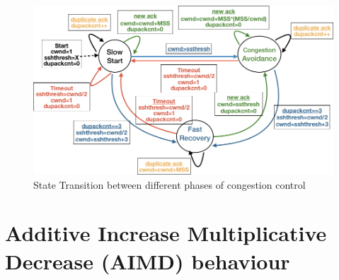 \begin{multicols}{2}
\begin{figure}[H]
\centering
\includegraphics[scale=1.1]{src/Figures/chap2/chap2-fig04.jpg}
\caption{State Transition between different phases of congestion control}\label{chap2-fig04}
\end{figure}

\section*{Additive Increase Multiplicative Decrease (AIMD) behaviour}


\end{multicols}
